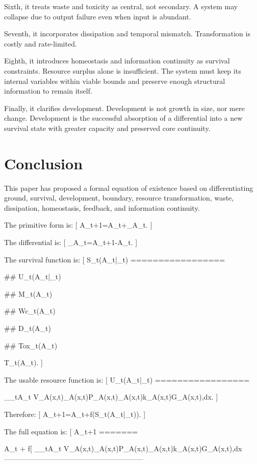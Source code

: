 \documentclass[11pt,a4paper]{article}
\begin{document}
Sixth, it treats waste and toxicity as central, not secondary. A system may collapse due to output failure even when input is abundant.

Seventh, it incorporates dissipation and temporal mismatch. Transformation is costly and rate-limited.

Eighth, it introduces homeostasis and information continuity as survival constraints. Resource surplus alone is insufficient. The system must keep its internal variables within viable bounds and preserve enough structural information to remain itself.

Finally, it clarifies development. Development is not growth in size, nor mere change. Development is the successful absorption of a differential into a new survival state with greater capacity and preserved core continuity.

\section{Conclusion}

This paper has proposed a formal equation of existence based on differentiating ground, survival, development, boundary, resource transformation, waste, dissipation, homeostasis, feedback, and information continuity.

The primitive form is:
[
A_{t+1}=A_t+\Delta_{\Omega}A_t.
]

The differential is:
[
\Delta_{\Omega}A_t=A_{t+1}-A_t.
]

The survival function is:
[
S_t(A_t|\Omega_t)
=================

## U_t(A_t|\Omega_t)

## M_t(A_t)

## Wc_t(A_t)

## D_t(A_t)

## Tox_t(A_t)

T_t(A_t).
]

The usable resource function is:
[
U_t(A_t|\Omega_t)
=================

\int_{\Omega_t\setminus A_t}
V_A(x,t)\alpha_A(x,t)P_A(x,t)\eta_A(x,t)k_A(x,t)G_A(x,t),dx.
]

Therefore:
[
A_{t+1}=A_t+f(S_t(A_t|\Omega_t)).
]

The full equation is:
[
A_{t+1}
=======

A_t
+
f\left[
\int_{\Omega_t\setminus A_t}
V_A(x,t)\alpha_A(x,t)P_A(x,t)\eta_A(x,t)k_A(x,t)G_A(x,t),dx
-----------------------------------------------------------
\end{document}
